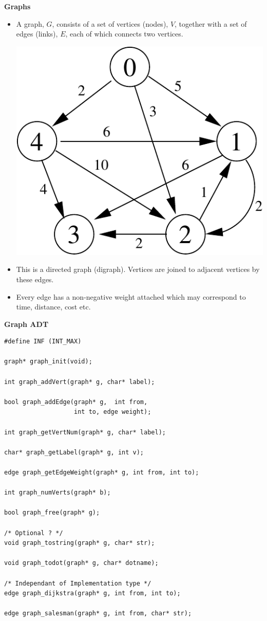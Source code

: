 \newpage
{\samepage
\begin{center}
{\Large{\bf Graphs}}
\end{center}
\begin{itemize}
\item A graph, $G$, consists of a set of vertices (nodes), $V$, together
with a set of edges (links), $E$, each of which connects two vertices.
\begin{center}
\includegraphics{../Images/grapha.pdf}
\end{center}
\item This is a directed graph (digraph).
Vertices are joined to adjacent vertices by these edges.
\item Every edge has a non-negative weight attached
which may correspond to time, distance, cost etc.
\end{itemize}
}

\newpage
{\samepage
\begin{center}
{\Large{\bf Graph ADT}}
\end{center}
{\small
\begin{verbatim}
#define INF (INT_MAX)

graph* graph_init(void);

int graph_addVert(graph* g, char* label);

bool graph_addEdge(graph* g,  int from,
                   int to, edge weight);

int graph_getVertNum(graph* g, char* label);

char* graph_getLabel(graph* g, int v);

edge graph_getEdgeWeight(graph* g, int from, int to);

int graph_numVerts(graph* b);

bool graph_free(graph* g);

/* Optional ? */
void graph_tostring(graph* g, char* str);

void graph_todot(graph* g, char* dotname);

/* Independant of Implementation type */
edge graph_dijkstra(graph* g, int from, int to);

edge graph_salesman(graph* g, int from, char* str);
\end{verbatim}
}}


